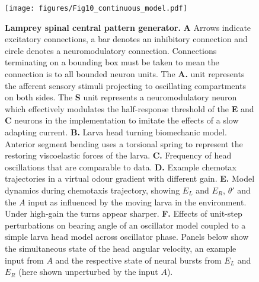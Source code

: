 \documentclass[10pt,a4paper]{article}
\begin{document}
\begin{figure}[!ht]
\begin{center}
\texttt{[image: figures/Fig10\_continuous\_model.pdf]}
\caption{{\bf Lamprey spinal central pattern generator.} {\bf A} Arrows indicate excitatory connections, a bar denotes an inhibitory connection and circle denotes a neuromodulatory connection. Connections terminating on a bounding box  must be taken to mean the connection is to all bounded neuron units. The {\bf A.} unit represents the afferent sensory stimuli projecting to oscillating compartments on both sides. The {\bf S} unit represents a neuromodulatory neuron which effectively modulates the half-response threshold of the {\bf E} and {\bf C} neurons in the \cite{wilson1999spikes} implementation to imitate the effects of a slow adapting current.
{\bf B.} Larva head turning biomechanic model. Anterior segment bending uses a torsional spring to represent the restoring viscoelastic forces of the larva.
{\bf C.} Frequency of head oscillations that are comparable to data.
{\bf D.} Example chemotax trajectories in a virtual odour gradient with different gain.
{\bf E.} Model dynamics during chemotaxis trajectory, showing $E_L$ and  $E_R$, $\theta'$ and the $A$ input as influenced by the moving larva in the environment. Under high-gain the turns appear sharper.
{\bf F.} Effects of unit-step perturbations on bearing angle of an oscillator model coupled to a simple larva head model across oscillator phase. Panels below show the simultaneous state of the head angular velocity, an example input from $A$ and the respective state of neural bursts from $E_L$ and $E_R$ (here shown unperturbed by the input $A$).
\label{fig:LampreyModel}}
\end{center}
\end{figure}
%
\end{document}
